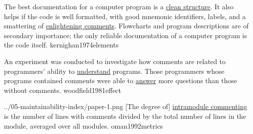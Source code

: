 \documentclass{article}
\begin{document}

  {The best documentation for a computer program is a \ul{clean structure}. It also helps if the code is well formatted, with good mnemonic identifiers, labels, and a smattering of \ul{enlightening comments}. Flowcharts and program descriptions are of secondary importance; the only reliable documentation of a computer program is the code itself.}
  {kernighan1974elements}


  {An experiment was conducted to investigate how comments are related to programmers' ability to \ul{understand} programs. Those programmers whose programs contained comments were able to \ul{answer} more questions than those without comments.}
  {woodfield1981effect}

\qte
  {../05-maintainability-index/paper-1.png}
  {[The degree of] \ul{intramodule commenting} is the number of lines with comments divided by the total number of lines in the module, averaged over all modules.}
  {oman1992metrics}
\end{document}
